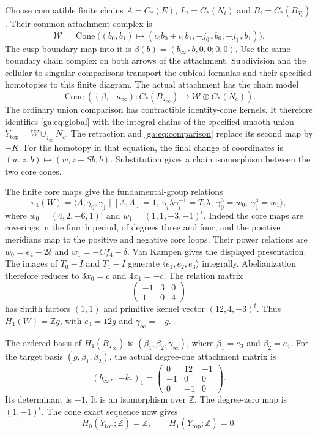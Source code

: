 Choose compatible finite chains $A=C_*(E)$, $L_i=C_*(N_i)$ and
$B_i=C_*(B_{T_i})$. Their common attachment complex is
\[
\mathcal W=\operatorname{Cone}\bigl(
(b_0,b_1)\mapsto(\iota_0b_0+\iota_1b_1,-j_{0*}b_0,-j_{1*}b_1)\bigr).
\]
The cusp boundary map into it is
$\beta(b)=(b_{\infty*}b,0,0;0,0)$.
Use the same boundary chain complex on both arrows of the attachment.
Subdivision and the cellular-to-singular comparisons transport the
cubical formulas and their specified homotopies to this finite diagram.
The actual attachment has the chain model
\begin{equation}\label{ga:eq:global}
\operatorname{Cone}\left((\beta,-\kappa_\infty):
C_*(B_{T_\infty})\to\mathcal W\oplus C_*(N_c)\right).
\end{equation}
The ordinary union comparison has contractible identity-cone kernels.
It therefore identifies \eqref{ga:eq:global} with the integral chains
of the specified smooth union $Y_{\mathrm{top}}=W\cup_{j_\infty}N_c$.
The retraction and \eqref{ga:eq:comparison} replace its second map by $-K$.
For the homotopy in that equation, the final change of coordinates is
$(w,z,b)\mapsto(w,z-Sb,b)$.
Substitution gives a chain isomorphism between the two core cones.

The finite core maps give the fundamental-group relations
\[
\pi_1(W)=\langle\Lambda,\gamma_0,\gamma_1\mid
[\Lambda,\Lambda]=1,\ \gamma_i\lambda\gamma_i^{-1}=T_i\lambda,
\ \gamma_0^3=w_0,\ \gamma_1^4=w_1\rangle,
\]
where $w_0=(4,2,-6,1)^t$ and $w_1=(1,1,-3,-1)^t$.
Indeed the core maps are coverings in the fourth period, of degrees three
and four, and the positive meridians map to the positive and negative core loops.
Their power relations are $w_0=e_4-2\delta$ and $w_1=-Cf_4-\delta$.
Van Kampen gives the displayed presentation.
The images of $T_0-I$ and $T_1-I$ generate
$\langle e_1,e_2,e_3\rangle$ integrally.
Abelianization therefore reduces to $3x_0=c$ and $4x_1=-c$.
The relation matrix
\[
\begin{pmatrix}-1&3&0\\1&0&4\end{pmatrix}
\]
has Smith factors $(1,1)$ and primitive kernel vector $(12,4,-3)^t$.
Thus $H_1(W)=\mathbb Zg$, with $e_4=12g$ and $\gamma_\infty=-g$.

The ordered basis of $H_1(B_{T_\infty})$ is
$(\beta_1,\beta_2,\gamma_\infty)$, where $\beta_1=e_3$ and $\beta_2=e_4$.
For the target basis $(g,\beta_1,\beta_2)$, the actual degree-one
attachment matrix is
\begin{equation}\label{ga:eq:global1}
(b_{\infty*},-k_*)_1=
\begin{pmatrix}0&12&-1\\-1&0&0\\0&-1&0\end{pmatrix}.
\end{equation}
Its determinant is $-1$. It is an isomorphism over $\mathbb Z$.
The degree-zero map is $(1,-1)^t$.
The cone exact sequence now gives
\begin{equation}\label{ga:eq:first}
H_0(Y_{\mathrm{top}};\mathbb Z)=\mathbb Z,
\qquad H_1(Y_{\mathrm{top}};\mathbb Z)=0.
\end{equation}

